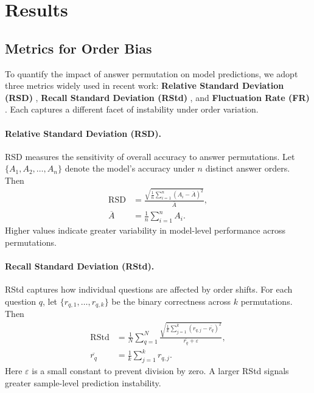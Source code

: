 \section{Results}
\label{sec:results}

\subsection{Metrics for Order Bias}
\label{sec:metrics}

To quantify the impact of answer permutation on model predictions, we adopt three metrics widely used in recent work: \textbf{Relative Standard Deviation (RSD)} \citep{reif-schwartz-2024-beyond}, \textbf{Recall Standard Deviation (RStd)} \citep{zheng2024largelanguagemodelsrobust}, and \textbf{Fluctuation Rate (FR)} \citep{wei-etal-2024-unveiling}.  
Each captures a different facet of instability under order variation.

\paragraph{Relative Standard Deviation (RSD).}
RSD measures the sensitivity of overall accuracy to answer permutations.  
Let $\{A_1,A_2,\dots,A_n\}$ denote the model’s accuracy under $n$ distinct answer orders. Then
\begin{align}
  \mathrm{RSD} &=
  \frac{\sqrt{\frac{1}{n}\sum_{i=1}^{n}(A_i-\overline{A})^2}}
       {\overline{A}}, \\
  \overline{A} &= \frac{1}{n}\sum_{i=1}^{n}A_i .
  \label{eq:rsd}
\end{align}
Higher values indicate greater variability in model-level performance across permutations.

\paragraph{Recall Standard Deviation (RStd).}
RStd captures how individual questions are affected by order shifts.  
For each question $q$, let $\{r_{q,1},\dots,r_{q,k}\}$ be the binary correctness across $k$ permutations. Then
\begin{align}
  \mathrm{RStd} &=
  \frac{1}{N}\sum_{q=1}^{N}
  \frac{
    \sqrt{\frac{1}{k}\sum_{j=1}^{k}(r_{q,j}-\overline{r_q})^2}
  }{
    \overline{r_q}+\varepsilon
  }, \\
  \overline{r_q} &= \frac{1}{k}\sum_{j=1}^{k}r_{q,j}.
  \label{eq:rstd}
\end{align}
Here $\varepsilon$ is a small constant to prevent division by zero. A larger RStd signals greater sample-level prediction instability.

